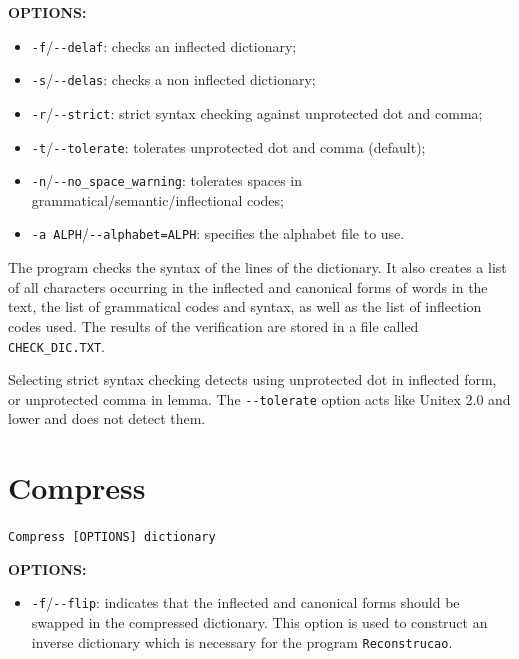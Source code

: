 \bigskip
\noindent \textbf{OPTIONS:}
\begin{itemize}
  \item \verb+-f+/\verb+--delaf+: checks an inflected dictionary;
  \item \verb+-s+/\verb+--delas+: checks a non inflected dictionary;
  \item \verb+-r+/\verb+--strict+: strict syntax checking against unprotected dot and comma;
  \item \verb+-t+/\verb+--tolerate+: tolerates unprotected dot and comma (default);
  \item \verb+-n+/\verb+--no_space_warning+: tolerates spaces in
  grammatical/semantic/inflectional codes;
  \item \verb+-a ALPH+/\verb+--alphabet=ALPH+: specifies the alphabet file to
        use. 
        
\end{itemize}

\bigskip
\noindent The program checks the syntax of the lines of the dictionary. It also creates a
list of all characters occurring in the inflected and canonical forms of words in
the text, the list of grammatical codes and syntax, as well as the list of
inflection codes used. The results of the verification are stored in a file
called \verb+CHECK_DIC.TXT+.

\bigskip
\noindent Selecting strict syntax checking detects using unprotected dot in
inflected form, or unprotected comma in lemma. The \verb+--tolerate+ option acts like Unitex 2.0
and lower and does not detect them.





\section{Compress}
\label{section-compress}
\verb+Compress [OPTIONS] dictionary+

\bigskip
\noindent \textbf{OPTIONS:}
\begin{itemize}
  \item \verb+-f+/\verb+--flip+: indicates
that the inflected and canonical forms should be swapped in the compressed
dictionary. This option is used to construct an inverse dictionary which is
necessary for the program \verb+Reconstrucao+.
\end{itemize}

